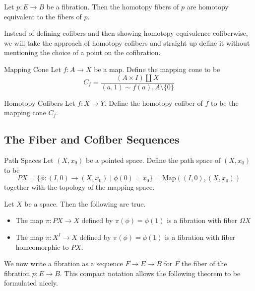\documentclass[a4paper]{article}
\begin{document}
\begin{prp}{}{} Let $p:E\to B$ be a fibration. Then the homotopy fibers of $p$ are homotopy equivalent to the fibers of $p$. 
\end{prp}

Instead of defining cofibers and then showing homotopy equivalence cofiberwise, we will take the approach of homotopy cofibers and straight up define it without mentioning the choice of a point on the cofibration. 

\begin{defn}{Mapping Cone}{} Let $f:A\to X$ be a map. Define the mapping cone to be $$C_f=\frac{(A\times I)\amalg X}{(a,1)\sim f(a),A\setminus\{0\}}$$
\end{defn}

\begin{defn}{Homotopy Cofibers}{} Let $f:X\to Y$. Define the homotopy cofiber of $f$ to be the mapping cone $C_f$. 
\end{defn}

\subsection{The Fiber and Cofiber Sequences}
\begin{defn}{Path Spaces}{} Let $(X,x_0)$ be a pointed space. Define the path space of $(X,x_0)$ to be $$PX=\{\phi:(I,0)\to(X,x_0)\;|\;\phi(0)=x_0\}=\text{Map}((I,0),(X,x_0))$$ together with the topology of the mapping space. 
\end{defn}

\begin{thm}{}{} Let $X$ be a space. Then the following are true. 
\begin{itemize}
\item The map $\pi:PX\to X$ defined by $\pi(\phi)=\phi(1)$ is a fibration with fiber $\Omega X$
\item The map $\pi:X^I\to X$ defined by $\pi(\phi)=\phi(1)$ is a fibration with fiber homeomorphic to $PX$. 
\end{itemize}
\end{thm}

We now write a fibration as a sequence $F\to E\to B$ for $F$ the fiber of the fibration $p:E\to B$. This compact notation allows the following theorem to be formulated nicely. 
\end{document}
